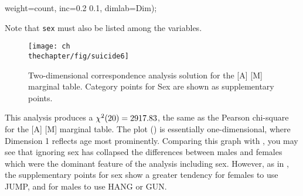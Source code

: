 \begin{listing}
   weight=count, inc=0.2 0.1, dimlab=Dim);
\end{listing}
Note that \texttt{sex} must also be listed among the 
variables.
\begin{figure}[htb]
  \centering
  \texttt{[image: ch\\thechapter/fig/suicide6]}
  \caption[Two-dimensional correspondence analysis
solution for the A M marginal table]{Two-dimensional correspondence analysis
solution for the [A] [M] marginal table.
Category points for Sex are shown as supplementary points.}\label{fig:suicide6}
\end{figure}

This analysis produces a $\chi^2 (20) = 2917.83$,
the same as the Pearson chi-square for the [A] [M] marginal table.
The plot () is essentially one-dimensional,
where Dimension 1 reflects age most prominently.
Comparing this graph with ,
you may see that ignoring sex has collapsed the differences between
males and females which were the dominant feature of the analysis
including sex.
However, as in , the supplementary points for sex 
show a greater tendency for females to use JUMP, and for males to use
HANG or GUN.
